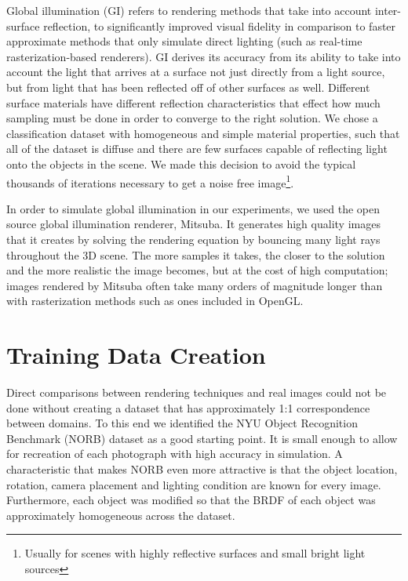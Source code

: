 \documentclass[10pt,twocolumn,letterpaper]{article}
\begin{document}
Global illumination (GI) refers to rendering methods that take into account inter-surface reflection, to significantly improved visual fidelity in comparison to faster approximate methods that only simulate direct lighting (such as real-time rasterization-based renderers).  GI derives its accuracy from its ability to take into account the light that arrives at a surface not just directly from a light source, but from light that has been reflected off of other surfaces as well. Different surface materials have different reflection characteristics that effect how much sampling must be done in order to converge to the right solution. We chose a classification dataset with homogeneous and simple material properties, such that all of the dataset is diffuse and there are few surfaces capable of reflecting light onto the objects in the scene. We made this decision to avoid the typical thousands of iterations necessary to get a noise free image\footnote{Usually for scenes with highly reflective surfaces and small bright light sources}.

In order to simulate global illumination in our experiments, we used the open source global illumination renderer, Mitsuba.  It generates high quality images that it creates by solving the rendering equation by bouncing many light rays throughout the 3D scene.  The more samples it takes, the closer to the solution and the more realistic the image becomes, but at the cost of high computation; images rendered by Mitsuba often take many orders of magnitude longer than with rasterization methods such as ones included in OpenGL.  

\section{Training Data Creation}
Direct comparisons between rendering techniques and real images could not be done without creating a dataset that has approximately 1:1 correspondence between domains.  To this end we identified the NYU Object Recognition Benchmark (NORB) dataset \cite{LeCun:2004:LMG:1896300.1896315} as a good starting point. It is small enough to allow for recreation of each photograph with high accuracy in simulation.  A characteristic that makes NORB even more attractive is that the object location, rotation, camera placement and lighting condition are known for every image. Furthermore, each object was modified so that the BRDF of each object was approximately homogeneous across the dataset.
\end{document}
